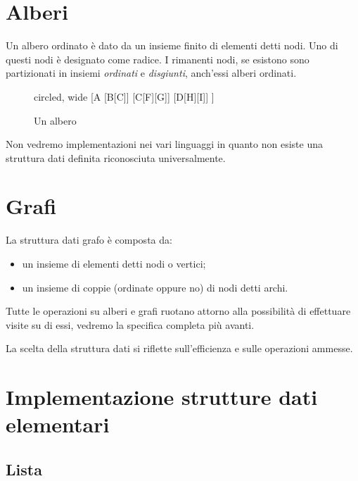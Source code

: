 \section{Alberi}

Un albero ordinato è dato da un insieme finito di elementi detti nodi.
Uno di questi nodi è designato come radice.
I rimanenti nodi, se esistono sono partizionati in insiemi \emph{ordinati} e \emph{disgiunti}, anch'essi alberi ordinati.

\begin{figure}[H]
	\centering
	\begin{forest} circled, wide
	[A
		[B[C]]
		[C[F][G]]
		[D[H][I]]
	]
	\end{forest}
	\caption[]{Un albero}
\end{figure}

Non vedremo implementazioni nei vari linguaggi in quanto non esiste una struttura dati definita riconosciuta universalmente.

\section{Grafi}

La struttura dati grafo è composta da:
\begin{itemize}
	\item un insieme di elementi detti nodi o vertici;
	\item un insieme di coppie (ordinate oppure no) di nodi detti archi.
\end{itemize}


Tutte le operazioni su alberi e grafi ruotano attorno alla possibilità di effettuare visite su di essi, vedremo la specifica completa più avanti.

\begin{note}
La scelta della struttura dati si riflette sull'efficienza e sulle operazioni ammesse.
\end{note}

\clearpage
\section{Implementazione strutture dati elementari}

\subsection{Lista}

